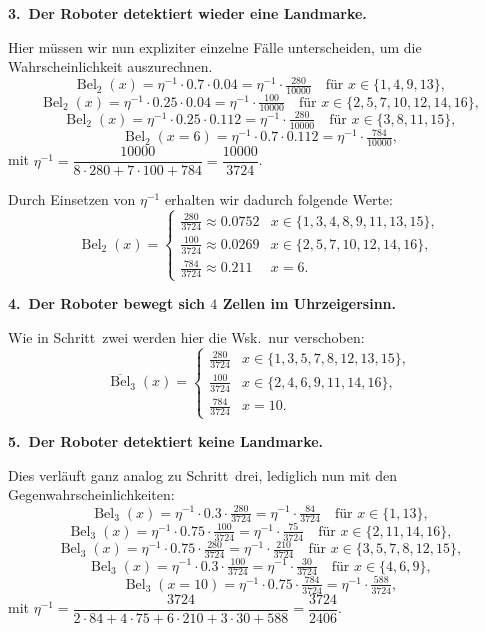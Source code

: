 \documentclass[11pt,a4paper]{article}
\newcommand{\Bel}{\operatorname{Bel}}
\newcommand{\pBel}{\overline{\operatorname{Bel}}}
\begin{document}
\textbf{3.\ Der Roboter detektiert wieder eine Landmarke.}

Hier müssen wir nun expliziter einzelne Fälle unterscheiden, um die Wahrscheinlichkeit
auszurechnen.
\[
  \Bel_2(x) = \eta^{-1}\cdot 0.7\cdot 0.04 = \eta^{-1}\cdot\tfrac{280}{10000}
  \quad\text{für } x\in\{1,4,9,13\},
\]
\[
  \Bel_2(x) = \eta^{-1}\cdot 0.25\cdot 0.04 = \eta^{-1}\cdot\tfrac{100}{10000}
  \quad\text{für } x\in\{2,5,7,10,12,14,16\},
\]
\[
  \Bel_2(x) = \eta^{-1}\cdot 0.25\cdot 0.112 = \eta^{-1}\cdot\tfrac{280}{10000}
  \quad\text{für } x\in\{3,8,11,15\},
\]
\[
  \Bel_2(x=6) = \eta^{-1}\cdot 0.7\cdot 0.112 = \eta^{-1}\cdot\tfrac{784}{10000},
\]
mit $\eta^{-1} = \dfrac{10000}{8\cdot 280 + 7\cdot 100 + 784} = \dfrac{10000}{3724}$.

Durch Einsetzen von $\eta^{-1}$ erhalten wir dadurch folgende Werte:
\[
  \Bel_2(x) =
  \begin{cases}
    \tfrac{280}{3724}\approx 0.0752 & x\in\{1,3,4,8,9,11,13,15\},\\[0.3em]
    \tfrac{100}{3724}\approx 0.0269 & x\in\{2,5,7,10,12,14,16\},\\[0.3em]
    \tfrac{784}{3724}\approx 0.211  & x=6.
  \end{cases}
\]

\textbf{4.\ Der Roboter bewegt sich $4$ Zellen im Uhrzeigersinn.}

Wie in Schritt~zwei werden hier die Wsk.\ nur verschoben:
\[
  \pBel_3(x) =
  \begin{cases}
    \tfrac{280}{3724} & x\in\{1,3,5,7,8,12,13,15\},\\[0.3em]
    \tfrac{100}{3724} & x\in\{2,4,6,9,11,14,16\},\\[0.3em]
    \tfrac{784}{3724} & x=10.
  \end{cases}
\]

\textbf{5.\ Der Roboter detektiert keine Landmarke.}

Dies verläuft ganz analog zu Schritt~drei, lediglich nun mit den Gegenwahrscheinlichkeiten:
\[
  \Bel_3(x) = \eta^{-1}\cdot 0.3\cdot\tfrac{280}{3724} = \eta^{-1}\cdot\tfrac{84}{3724}
  \quad\text{für } x\in\{1,13\},
\]
\[
  \Bel_3(x) = \eta^{-1}\cdot 0.75\cdot\tfrac{100}{3724} = \eta^{-1}\cdot\tfrac{75}{3724}
  \quad\text{für } x\in\{2,11,14,16\},
\]
\[
  \Bel_3(x) = \eta^{-1}\cdot 0.75\cdot\tfrac{280}{3724} = \eta^{-1}\cdot\tfrac{210}{3724}
  \quad\text{für } x\in\{3,5,7,8,12,15\},
\]
\[
  \Bel_3(x) = \eta^{-1}\cdot 0.3\cdot\tfrac{100}{3724} = \eta^{-1}\cdot\tfrac{30}{3724}
  \quad\text{für } x\in\{4,6,9\},
\]
\[
  \Bel_3(x=10) = \eta^{-1}\cdot 0.75\cdot\tfrac{784}{3724} = \eta^{-1}\cdot\tfrac{588}{3724},
\]
mit $\eta^{-1} = \dfrac{3724}{2\cdot 84 + 4\cdot 75 + 6\cdot 210 + 3\cdot 30 + 588} = \dfrac{3724}{2406}$.
\end{document}
